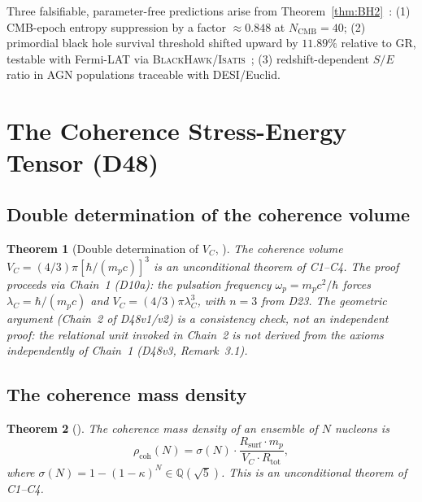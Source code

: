 \documentclass[11pt,a4paper]{article}
\theoremstyle{plain}
\newtheorem{theorem}{Theorem}[section]
\theoremstyle{definition}
\theoremstyle{remark}
\newcommand{\Rsurf}{R_{\mathrm{surf}}}
\newcommand{\Rtot}{R_{\mathrm{tot}}}
\newcommand{\sigmaN}{\sigma(N)}
\newcommand{\rhocoh}{\rho_{\mathrm{coh}}}
\begin{document}
Three falsifiable, parameter-free predictions arise from Theorem~\ref{thm:BH2}~\cite{D38}: (1) CMB-epoch entropy suppression by a factor $\approx 0.848$ at $N_{\mathrm{CMB}}=40$; (2) primordial black hole survival threshold shifted upward by $11.89\%$ relative to GR, testable with Fermi-LAT via \textsc{BlackHawk}/\textsc{Isatis}~\cite{D45}; (3) redshift-dependent $S/E$ ratio in AGN populations traceable with DESI/Euclid.

\section{The Coherence Stress-Energy Tensor (D48)}
\label{sec:Ccoh}

\subsection{Double determination of the coherence volume}
\label{subsec:VC}
\begin{theorem}[Double determination of $V_C$, \cite{D48}]
\label{thm:VC}
The coherence volume $V_C = (4/3)\pi[\hbar/(m_p c)]^3$ is an unconditional theorem of C1--C4. The proof proceeds via Chain~1 (D10a): the pulsation frequency $\omega_p = m_p c^2/\hbar$ forces $\lambda_C = \hbar/(m_p c)$ and $V_C = (4/3)\pi\lambda_C^3$, with $n=3$ from D23. The geometric argument (Chain~2 of D48v1/v2) is a consistency check, not an independent proof: the relational unit invoked in Chain~2 is not derived from the axioms independently of Chain~1 (D48v3, Remark~3.1).
\end{theorem}

\subsection{The coherence mass density}
\label{subsec:rhocoh}
\begin{theorem}[\cite{D48}]
\label{thm:rhocoh}
The coherence mass density of an ensemble of $N$ nucleons is
\begin{equation}
\rhocoh(N) = \sigmaN \cdot \frac{\Rsurf \cdot m_p}{V_C \cdot \Rtot},
\end{equation}
where $\sigmaN = 1-(1-\kappa)^N \in \mathbb{Q}(\sqrt{5})$. This is an unconditional theorem of C1--C4.
\end{theorem}
\end{document}
